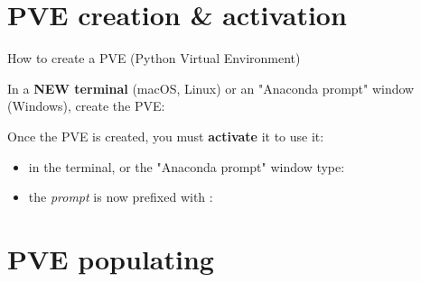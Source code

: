\documentclass[10pt,serif,mathserif,compress,hyperref={colorlinks}]{beamer}
\begin{document}
\section{PVE creation \& activation}

\begin{frame}{How to create a PVE (Python Virtual Environment)}

  \begin{tcolorbox}[title={\bf PVE creation}]
    In a \textbf{NEW terminal} (macOS, Linux) or an "Anaconda prompt" window (Windows),
    create the  PVE:\\
    \hspace*{10pt}\vspace*{-1mm}
  \end{tcolorbox}
  
  \begin{tcolorbox}[title={\bf PVE activation}]
    Once the  PVE is created, you must {\bf activate} it to use it:
    
    \begin{itemize}
    \item in the terminal, or the "Anaconda prompt" window type:\\
      \hspace*{10pt}\medskip
    \item the {\em prompt} is now prefixed with :\\[-1mm]
      \end{itemize}
  \end{tcolorbox}
  
\end{frame}

\section{PVE populating}
\end{document}
